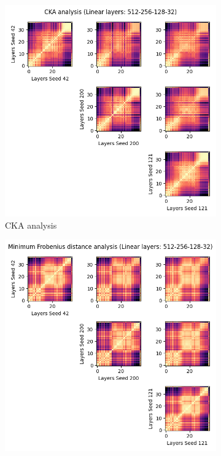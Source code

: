\documentclass[../main.tex]{subfiles}
\begin{document}
\begin{figure}[ht!]
     \centering
    \begin{subfigure}[b]{0.45\textwidth}
         \centering
        \includegraphics[width=\textwidth]{figures/rs/sim_ae/cka_512-256-128-32__42_200_121.png} 
        \caption{CKA analysis}
        \label{fig:cka_ae_512_256_128_32}
     \end{subfigure}\hfill
      \begin{subfigure}[b]{0.45\textwidth}
         \centering
         \includegraphics[width=\textwidth]{figures/rs/sim_ae/frob_512-256-128-32__42_200_121.png}

\end{subfigure}
\end{figure}
\end{document}
